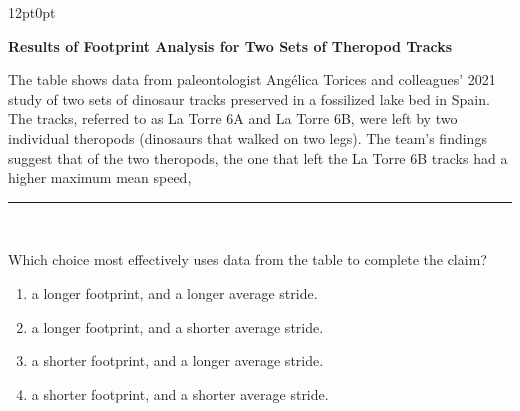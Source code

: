 \documentclass[11pt, twocolumn]{article}
\newcounter{questionnum}
\begin{document}
\vspace{6pt}\noindent
\begin{minipage}{\columnwidth}\raggedright
\noindent{}\par\vspace{8pt}
\begin{adjustwidth}{12pt}{0pt}
\begin{center}
\textbf{Results of Footprint Analysis for Two Sets of Theropod Tracks}
\end{center}
\noindent{}

The table shows data from paleontologist Angélica Torices and colleagues' 2021 study of two sets of dinosaur tracks preserved in a fossilized lake bed in Spain. The tracks, referred to as La Torre 6A and La Torre 6B, were left by two individual theropods (dinosaurs that walked on two legs). The team's findings suggest that of the two theropods, the one that left the La Torre 6B tracks had a higher maximum mean speed, \,\rule{2cm}{0.4pt}\,
\vspace{6pt}

Which choice most effectively uses data from the table to complete the claim?
\begin{enumerate}[label=\Alph*),leftmargin=18pt,topsep=3pt,itemsep=2pt]
  \item a longer footprint, and a longer average stride.
  \item a longer footprint, and a shorter average stride.
  \item a shorter footprint, and a longer average stride.
  \item a shorter footprint, and a shorter average stride.
\end{enumerate}
\end{adjustwidth}
\end{minipage}\par
\end{document}
